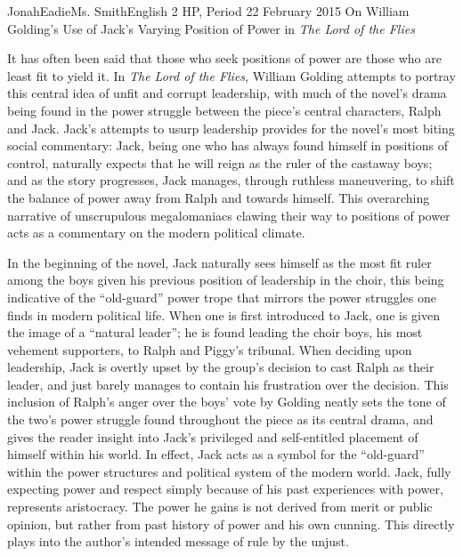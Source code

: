 \documentclass[12pt,letterpaper]{article}
\begin{document}
\begin{mla}{Jonah}{Eadie}{Ms. Smith}{English 2 HP, Period 2}{2 February 2015}
{On William Golding's Use of Jack's Varying Position of Power in \textit{The 
Lord of the Flies}}

It has often been said that those who seek positions of power are those who are 
least fit to yield it. In \textit{The Lord of the Flies}, William Golding 
attempts to portray this central idea of unfit and corrupt leadership, with 
much of the novel's drama being found in the power struggle between the piece's 
central characters, Ralph and Jack. Jack's attempts to usurp leadership 
provides for the novel's most biting social commentary: Jack, being one who has 
always found himself in positions of control, naturally expects that he will 
reign as the ruler of the castaway boys; and as the story progresses, Jack 
manages, through ruthless maneuvering, to shift the balance of power away from 
Ralph and towards himself. This overarching narrative of unscrupulous 
megalomaniacs clawing their way to positions of power acts as a commentary on 
the modern political climate.

In the beginning of the novel, Jack naturally sees himself as the most fit 
ruler among the boys given his previous position of leadership in the choir, 
this being indicative of the “old-guard” power trope that mirrors the power 
struggles one finds in modern political life. When one is first introduced to 
Jack, one is given the image of a “natural leader”; he is found leading the 
choir boys, his most vehement supporters, to Ralph and Piggy's tribunal. When 
deciding upon leadership, Jack is overtly upset by the group's decision to cast 
Ralph as their leader, and just barely manages to contain his frustration over 
the decision. This inclusion of Ralph's anger over the boys’ vote by Golding 
neatly sets the tone of the two's power struggle found throughout the piece as 
its central drama, and gives the reader insight into Jack's privileged and 
self-entitled placement of himself within his world. In effect, Jack acts as a 
symbol for the “old-guard” within the power structures and political system of 
the modern world. Jack, fully expecting power and respect simply because of his 
past experiences with power, represents aristocracy. The power he gains is not 
derived from merit or public opinion, but rather from past history of power and 
his own cunning. This directly plays into the author's intended message of rule 
by the unjust.


\end{mla}
\end{document}

